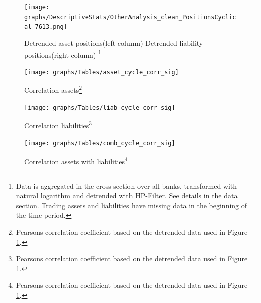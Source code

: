 \documentclass[12pt, a4paper]{article} %
\begin{document}
\begin{figure}[hbtp]
\begin{minipage}{\textwidth}

\centering
\caption[1]{Detrended asset positions(left column) \hspace{2cm} Detrended liability positions(right column) \footnote{Data is aggregated in the cross section over all banks, transformed with natural logarithm and detrended with HP-Filter. See details in the data section. Trading assets and liabilities have missing data in the beginning of the time period.} }
\texttt{[image: graphs/DescriptiveStats/OtherAnalysis\_clean\_PositionsCyclical\_7613.png]}
\label{fig:positions}

\end{minipage}
\end{figure}


\begin{figure}[hbtp]
\begin{minipage}{\textwidth}

\centering
\caption[1]{Correlation assets\footnote{Pearsons correlation coefficient based on the detrended data used in Figure \ref{fig:positions}.} }
\texttt{[image: graphs/Tables/asset\_cycle\_corr\_sig]}
\label{fig:corr_assets}

\end{minipage}
\end{figure}

\begin{figure}[hbtp]
\begin{minipage}{\textwidth}

\centering
\caption[1]{Correlation liabilities\footnote{Pearsons correlation coefficient based on the detrended data used in Figure \ref{fig:positions}.} }
\texttt{[image: graphs/Tables/liab\_cycle\_corr\_sig]}
\label{fig:corr_liab}

\end{minipage}
\end{figure}



\begin{figure}[hbtp]
\begin{minipage}{\textwidth}

\centering
\caption[1]{Correlation assets with liabilities\footnote{Pearsons correlation coefficient based on the detrended data used in Figure \ref{fig:positions}.} }
\texttt{[image: graphs/Tables/comb\_cycle\_corr\_sig]}
\label{fig:corr_comb}

\end{minipage}
\end{figure}
\end{document}
